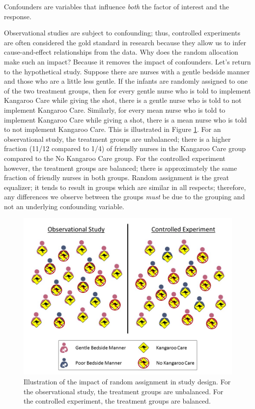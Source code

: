 \documentclass[]{book}
\theoremstyle{definition}
\theoremstyle{definition}
\theoremstyle{remark}
\let\BeginKnitrBlock\begin \let\EndKnitrBlock\end
\begin{document}
\BeginKnitrBlock{rmdtip}
Confounders are variables that influence \emph{both} the factor of
interest and the response.
\EndKnitrBlock{rmdtip}

Observational studies are subject to confounding; thus, controlled
experiments are often considered the gold standard in research because
they allow us to infer cause-and-effect relationships from the data. Why
does the random allocation make such an impact? Because it removes the
impact of confounders. Let's return to the hypothetical study. Suppose
there are nurses with a gentle bedside manner and those who are a little
less gentle. If the infants are randomly assigned to one of the two
treatment groups, then for every gentle nurse who is told to implement
Kangaroo Care while giving the shot, there is a gentle nurse who is told
to not implement Kangaroo Care. Similarly, for every mean nurse who is
told to implement Kangaroo Care while giving a shot, there is a mean
nurse who is told to not implement Kangaroo Care. This is illustrated in
Figure \ref{fig:data-randomization}. For an observational study, the
treatment groups are unbalanced; there is a higher fraction (11/12
compared to 1/4) of friendly nurses in the Kangaroo Care group compared
to the No Kangaroo Care group. For the controlled experiment however,
the treatment groups are balanced; there is approximately the same
fraction of friendly nurses in both groups. Random assignment is the
great equalizer; it tends to result in groups which are similar in all
respects; therefore, any differences we observe between the groups
\emph{must} be due to the grouping and not an underlying confounding
variable.

\begin{figure}

{\centering \includegraphics[width=0.8\linewidth]{./images/Data-Randomization} 

}

\caption{Illustration of the impact of random assignment in study design. For the observational study, the treatment groups are unbalanced.  For the controlled experiment, the treatment groups are balanced.}\label{fig:data-randomization}
\end{figure}
\end{document}

